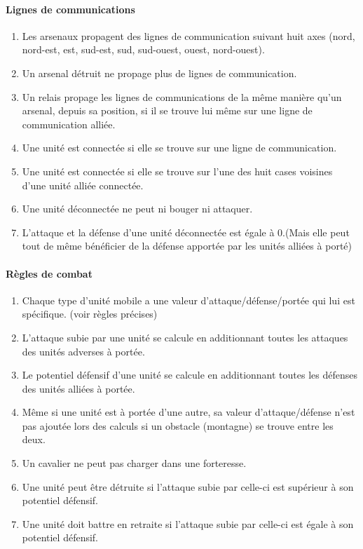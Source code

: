 		\paragraph{Lignes de communications}
		\begin{enumerate}
		\item Les arsenaux propagent des lignes de communication suivant huit axes (nord, nord-est, est, sud-est, sud, sud-ouest, ouest, nord-ouest).
		\item Un arsenal détruit ne propage plus de lignes de communication.
		\item Un relais propage les lignes de communications de la même manière qu'un arsenal, depuis sa position, si il se trouve lui même sur une ligne de communication alliée.
		\item Une unité est connectée si elle se trouve sur une ligne de communication.
		\item Une unité est connectée si elle se trouve sur l'une des huit cases voisines d'une unité alliée connectée.
		\item Une unité déconnectée ne peut ni bouger ni attaquer.
		\item L'attaque et la défense d'une unité déconnectée est égale à 0.(Mais elle peut tout de même bénéficier de la défense apportée par les unités alliées à porté)
		\end{enumerate}
		
		\paragraph{Règles de combat}
		\begin{enumerate}
		\item Chaque type d'unité mobile a une valeur d'attaque/défense/portée qui lui est spécifique. (voir règles précises)
		\item L'attaque subie par une unité se calcule en additionnant toutes les attaques des unités adverses à portée.
		\item Le potentiel défensif d'une unité se calcule en additionnant toutes les défenses des unités alliées à portée.
		\item Même si une unité est à portée d'une autre, sa valeur d'attaque/défense n'est pas ajoutée lors des calculs si un obstacle (montagne) se trouve entre les deux.
		\item Un cavalier ne peut pas charger dans une forteresse.
		\item Une unité peut être détruite si l'attaque subie par celle-ci est supérieur à son potentiel défensif.
		\item Une unité doit battre en retraite si l'attaque subie par celle-ci est égale à son potentiel défensif.
		\end{enumerate}
		
